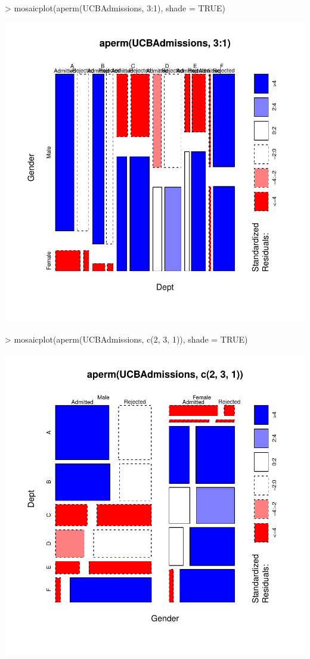 \documentclass[12pt,letterpaper,final]{article}
\begin{document}
\begin{Schunk}
\begin{Sinput}
> mosaicplot(aperm(UCBAdmissions, 3:1), shade = TRUE)
\end{Sinput}
\end{Schunk}
\includegraphics{lect_main-043}

\begin{Schunk}
\begin{Sinput}
> mosaicplot(aperm(UCBAdmissions, c(2, 3, 1)), shade = TRUE)
\end{Sinput}
\end{Schunk}
\includegraphics{lect_main-044}
\end{document}
